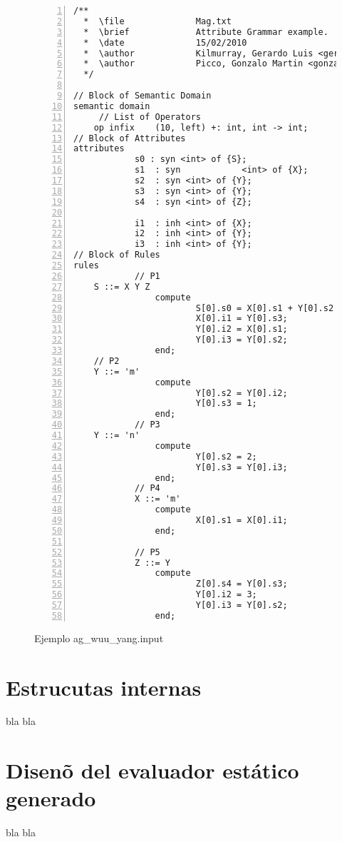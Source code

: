 \begin{figure}
  \centering
\lstset{language=inform}
\scriptsize
\begin{lstlisting}[frame=single,numbers=left]
/**
  *  \file              Mag.txt
  *  \brief             Attribute Grammar example.
  *  \date              15/02/2010
  *  \author            Kilmurray, Gerardo Luis <gerakilmurray@gmail.com>
  *  \author            Picco, Gonzalo Martin <gonzalopicco@gmail.com>
  */

// Block of Semantic Domain
semantic domain
     // List of Operators 
    op infix    (10, left) +: int, int -> int;
// Block of Attributes
attributes
            s0 : syn <int> of {S};
            s1  : syn            <int> of {X};
            s2  : syn <int> of {Y};
            s3  : syn <int> of {Y};
            s4  : syn <int> of {Z};
                
            i1  : inh <int> of {X};
            i2  : inh <int> of {Y};
            i3  : inh <int> of {Y};
// Block of Rules
rules
            // P1
    S ::= X Y Z
                compute                        
                        S[0].s0 = X[0].s1 + Y[0].s2 + Y[0].s3 + Z[0].s4;
                        X[0].i1 = Y[0].s3;
                        Y[0].i2 = X[0].s1;
                        Y[0].i3 = Y[0].s2;
                end;
    // P2
    Y ::= 'm'
                compute
                        Y[0].s2 = Y[0].i2;
                        Y[0].s3 = 1;
                end;
            // P3
    Y ::= 'n'
                compute
                        Y[0].s2 = 2;
                        Y[0].s3 = Y[0].i3;
                end;
            // P4
            X ::= 'm'
                compute
                        X[0].s1 = X[0].i1;
                end;
                        
            // P5
            Z ::= Y
                compute
                        Z[0].s4 = Y[0].s3;
                        Y[0].i2 = 3;
                        Y[0].i3 = Y[0].s2;
                end;           
\end{lstlisting}
  \caption{Ejemplo ag\_wuu\_yang.input }
  \label{fig:ejemplo_mag}
\end{figure}
 
\section{Estrucutas internas}
bla bla

\section{Disen\~o del evaluador est\'atico generado}

bla bla